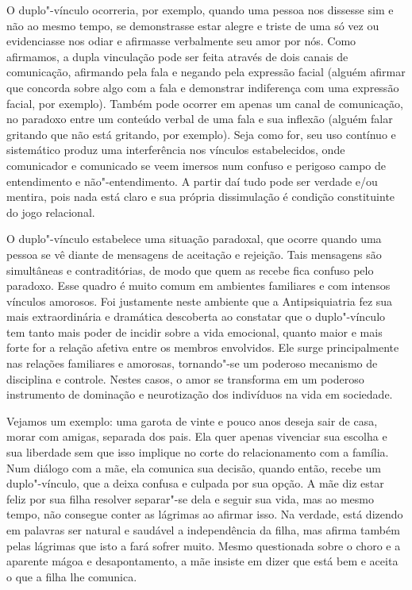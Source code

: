 O duplo"-vínculo ocorreria, por exemplo, quando uma pessoa nos dissesse
sim e não ao mesmo tempo, se demonstrasse estar alegre e triste de uma
só vez ou evidenciasse nos odiar e afirmasse verbalmente seu amor por
nós. Como afirmamos, a dupla vinculação pode ser feita através de dois
canais de comunicação, afirmando pela fala e negando pela expressão
facial (alguém afirmar que concorda sobre algo com a fala e demonstrar
indiferença com uma expressão facial, por exemplo). Também pode ocorrer
em apenas um canal de comunicação, no paradoxo entre um conteúdo verbal
de uma fala e sua inflexão (alguém falar gritando que não está gritando,
por exemplo). Seja como for, seu uso contínuo e sistemático produz uma
interferência nos vínculos estabelecidos, onde comunicador e comunicado
se veem imersos num confuso e perigoso campo de entendimento e
não"-entendimento. A partir daí tudo pode ser verdade e/ou mentira, pois
nada está claro e sua própria dissimulação é condição constituinte do
jogo relacional.

O duplo"-vínculo estabelece uma situação paradoxal, que ocorre quando uma
pessoa se vê diante de mensagens de aceitação e rejeição. Tais mensagens
são simultâneas e contraditórias, de modo que quem as recebe fica
confuso pelo paradoxo. Esse quadro é muito comum em ambientes familiares
e com intensos vínculos amorosos. Foi justamente neste ambiente que a
Antipsiquiatria fez sua mais extraordinária e dramática descoberta ao
constatar que o duplo"-vínculo tem tanto mais poder de incidir sobre a
vida emocional, quanto maior e mais forte for a relação afetiva entre os
membros envolvidos. Ele surge principalmente nas relações familiares e
amorosas, tornando"-se um poderoso mecanismo de disciplina e controle.
Nestes casos, o amor se transforma em um poderoso instrumento de
dominação e neurotização dos indivíduos na vida em sociedade.

Vejamos um exemplo: uma garota de vinte e pouco anos deseja sair de
casa, morar com amigas, separada dos pais. Ela quer apenas vivenciar sua
escolha e sua liberdade sem que isso implique no corte do relacionamento
com a família. Num diálogo com a mãe, ela comunica sua decisão, quando
então, recebe um duplo"-vínculo, que a deixa confusa e culpada por sua
opção. A mãe diz estar feliz por sua filha resolver separar"-se dela e
seguir sua vida, mas ao mesmo tempo, não consegue conter as lágrimas ao
afirmar isso. Na verdade, está dizendo em palavras ser natural e
saudável a independência da filha, mas afirma também pelas lágrimas que
isto a fará sofrer muito. Mesmo questionada sobre o choro e a aparente
mágoa e desapontamento, a mãe insiste em dizer que está bem e aceita o
que a filha lhe comunica.

